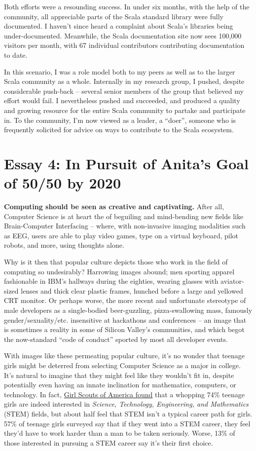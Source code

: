 \documentclass[acmtocl]{acmtrans2m}
\begin{document}
Both efforts were a resounding success. In under six months, with the help of
the community, all appreciable parts of the Scala standard library were fully
documented. I haven't since heard a complaint about Scala's libraries being
under-documented. Meanwhile, the Scala documentation site now sees 100,000
visitors per month, with 67 individual contributors contributing
documentation to date.

In this scenario, I was a role model both to my peers as well as to the larger
Scala community as a whole. Internally in my research group, I pushed, despite
considerable push-back -- several senior members of the group that
believed my effort would fail. I nevertheless pushed and succeeded, and produced a quality
and growing resource for the entire Scala community to partake and participate in. To the
community, I'm now viewed as a leader, a ``doer'', someone who is frequently
solicited for advice on ways to contribute to the Scala ecosystem.


\section*{\textbf{Essay 4:} In Pursuit of Anita's Goal of 50/50 by 2020}

\textbf{Computing should be seen as creative and captivating.}
After all, Computer Science is at heart the of beguiling and mind-bending new
fields like {Brain-Computer} Interfacing -- where, with non-invasive imaging
modalities such as EEG, users are able to play video games, type on a virtual
keyboard, pilot robots, and more, using thoughts alone.

Why is it then that popular culture depicts those who work in the field of
computing so undesirably? Harrowing images abound; men sporting apparel
fashionable in IBM's hallways during the eighties, wearing glasses with
aviator-sized lenses and thick clear plastic frames, hunched before a large
and yellowed CRT monitor. Or perhaps worse, the more recent and unfortunate
stereotype of male developers as a {single-bodied} {beer-guzzling},
{pizza-swallowing} mass, famously gender/sexuality/etc. insensitive at
hackathons and conferences -- an image that is sometimes a reality in
some of Silicon Valley's communities, and which begot the {now-standard} ``code
of conduct'' sported by most all developer events.

With images like these permeating popular culture, it's no wonder that teenage
girls might be deterred from selecting Computer Science as a major in college.
It's natural to imagine that they might feel like they wouldn't fit in,
despite potentially even having an innate inclination for mathematics,
computers, or technology. In fact,
\href{https://www.girlscouts.org/research/pdf/generation\_stem\_full\_report.pdf}{Girl Scouts of America found}
\cite{Girlscouts} that a whopping 74\% teenage girls are indeed interested in {\em
Science, Technology, Engineering, and Mathematics} (STEM) fields, but about
half feel that STEM isn't a typical career path for girls. 57\% of teenage
girls surveyed say that if they went into a STEM career, they feel they'd have
to work harder than a man to be taken seriously. Worse, 13\% of those
interested in pursuing a STEM career say it's their first choice.
\end{document}
